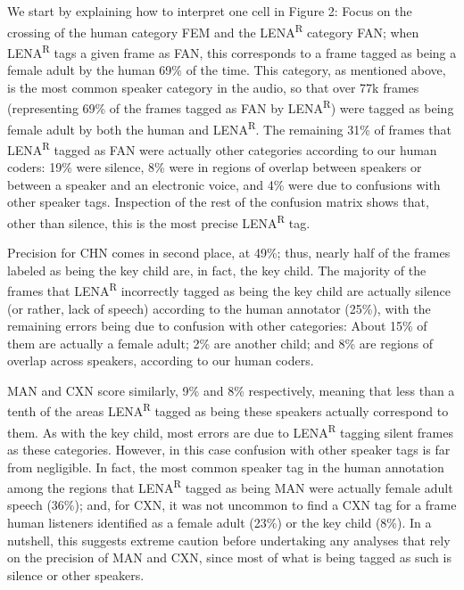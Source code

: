 \documentclass[english,table,man,floatsintext]{apa6}
\begin{document}
We start by explaining how to interpret one cell in Figure 2: Focus on the crossing of the human category FEM and the LENA\textsuperscript{R} category FAN; when LENA\textsuperscript{R} tags a given frame as FAN, this corresponds to a frame tagged as being a female adult by the human 69\% of the time. This category, as mentioned above, is the most common speaker category in the audio, so that over 77k frames (representing 69\% of the frames tagged as FAN by LENA\textsuperscript{R}) were tagged as being female adult by both the human and LENA\textsuperscript{R}. The remaining 31\% of frames that LENA\textsuperscript{R} tagged as FAN were actually other categories according to our human coders: 19\% were silence, 8\% were in regions of overlap between speakers or between a speaker and an electronic voice, and 4\% were due to confusions with other speaker tags. Inspection of the rest of the confusion matrix shows that, other than silence, this is the most precise LENA\textsuperscript{R} tag.

Precision for CHN comes in second place, at 49\%; thus, nearly half of the frames labeled as being the key child are, in fact, the key child. The majority of the frames that LENA\textsuperscript{R} incorrectly tagged as being the key child are actually silence (or rather, lack of speech) according to the human annotator (25\%), with the remaining errors being due to confusion with other categories: About 15\% of them are actually a female adult; 2\% are another child; and 8\% are regions of overlap across speakers, according to our human coders.

MAN and CXN score similarly, 9\% and 8\% respectively, meaning that less than a tenth of the areas LENA\textsuperscript{R} tagged as being these speakers actually correspond to them. As with the key child, most errors are due to LENA\textsuperscript{R} tagging silent frames as these categories. However, in this case confusion with other speaker tags is far from negligible. In fact, the most common speaker tag in the human annotation among the regions that LENA\textsuperscript{R} tagged as being MAN were actually female adult speech (36\%); and, for CXN, it was not uncommon to find a CXN tag for a frame human listeners identified as a female adult (23\%) or the key child (8\%). In a nutshell, this suggests extreme caution before undertaking any analyses that rely on the precision of MAN and CXN, since most of what is being tagged as such is silence or other speakers.
\end{document}
